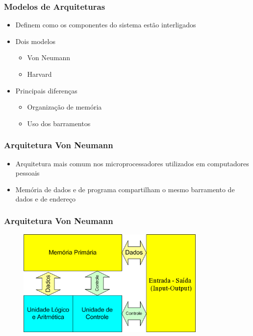 \documentclass[aspectratio=169,
				xcolor=table]{beamer}
\begin{document}
	\begin{frame}
		\frametitle{Modelos de Arquiteturas}
		\begin{itemize}
			\item Definem como os componentes do sistema estão interligados
			\vspace{1em}
			\item Dois modelos
			\begin{itemize}
				\item Von Neumann
				\item Harvard
			\end{itemize}
			\vspace{1em}
			\item Principais diferenças
			\begin{itemize}
				\item Organização de memória
				\item Uso dos barramentos
	
			\end{itemize}
		\end{itemize}
	\end{frame}
	
	\begin{frame}
		\frametitle{Arquitetura Von Neumann}
			\begin{itemize}
				\item Arquitetura mais comum nos microprocessadores utilizados em computadores pessoais
				\vspace{1em}
				\item Memória de dados e de programa compartilham o mesmo barramento de dados e de endereço

			\end{itemize}	

	\end{frame}

	\begin{frame}
		\frametitle{Arquitetura Von Neumann}
		\begin{figure}
		\centering
			\includegraphics[height=0.7\textheight, keepaspectratio]{../figs/cap04/neumann} 
			
		\end{figure}
	\end{frame}
\end{document}
